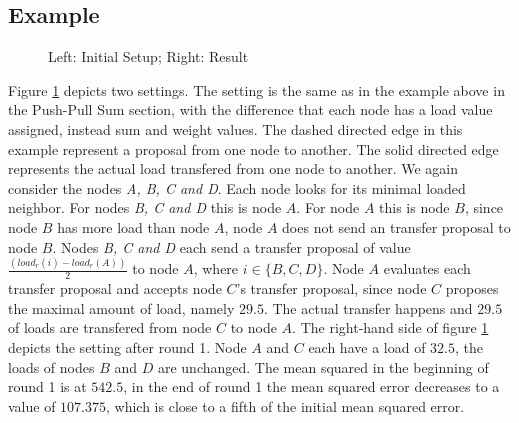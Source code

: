 \subsection{Example}\label{subsec:exampleDAB}
 \begin{figure}
    \centering
    
    \caption{Left: Initial Setup; Right: Result}
    \label{fig:DABExampleAlgo}
 \end{figure}
 Figure \ref{fig:DABExampleAlgo} depicts two settings. The setting is the same as in the example above in the Push-Pull Sum section, with the difference that each node has a load value assigned, instead sum and weight values. The dashed directed edge in this example represent a proposal from one node to another. The solid directed edge represents the actual load transfered from one node to another. We again consider the nodes \textit{A, B, C and D}. Each node looks for its minimal loaded neighbor. For nodes \textit{B, C and D} this is node $A$. For node $A$ this is node $B$, since node $B$ has more load than node $A$, node $A$ does not send an transfer proposal to node $B$. Nodes \textit{B, C and D} each send a transfer proposal of value $\frac{(load_r(i)-load_r(A))}{2}$ to node $A$, where $i \in \{B,C,D\}$. Node $A$ evaluates each transfer proposal and accepts node $C$'s transfer proposal, since node $C$ proposes the maximal amount of load, namely $29.5$. The actual transfer happens and $29.5$ of loads are transfered from node $C$ to node $A$. The right-hand side of figure \ref{fig:DABExampleAlgo} depicts the setting after round 1. Node $A$ and $C$ each have a load of $32.5$, the loads of nodes $B$
 and $D$ are unchanged. The mean squared in the beginning of round 1 is at $542.5$, in the end of round 1 the mean squared error decreases to a value of $107.375$, which is close to a fifth of the initial mean squared error. 

